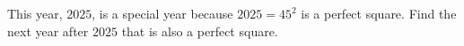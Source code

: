 This year, $2025$, is a special year because $2025=45^2$ is a perfect square. Find the next year after $2025$ that is also a perfect square.
